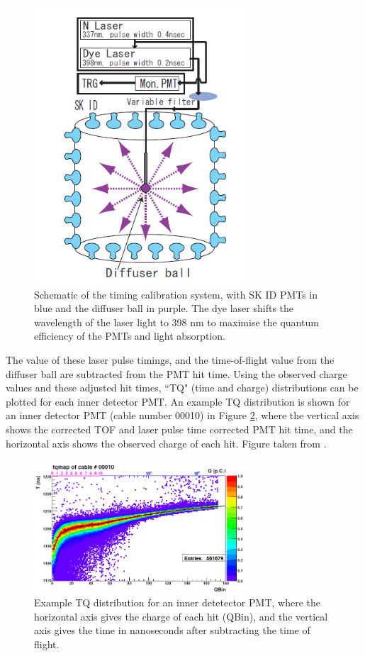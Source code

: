\begin{figure}
\centering
    \includegraphics[width=0.7\textwidth]{Figures/timecalibsystem.png}
\caption{Schematic of the timing calibration system, with SK ID PMTs in blue and the diffuser ball in purple. The dye laser shifts the wavelength of the laser light to 398 nm to maximise the quantum efficiency of the PMTs and light absorption.}
    \label{fig:timecalibsystem}
\end{figure}


The value of these laser pulse timings, and the time-of-flight value from the diffuser ball are subtracted from the PMT hit time. Using the observed charge values and these adjusted hit times, ``TQ" (time and charge) distributions can be plotted for each inner detector PMT. An example TQ distribution is shown for an inner detector PMT (cable number 00010) in Figure \ref{fig:TQdist}, where the vertical axis shows the corrected TOF and laser pulse time corrected PMT hit time, and the horizontal axis shows the observed charge of each hit. Figure taken from \cite{abe_calibration_2014}. 

\begin{figure}
    \centering 
    \includegraphics[width=0.7\textwidth]{Figures/TQdist.png}
\caption{Example TQ distribution for an inner detetector PMT, where the horizontal axis gives the charge of each hit (QBin), and the vertical axis gives the time in nanoseconds after subtracting the time of flight.}
    \label{fig:TQdist}
\end{figure}


